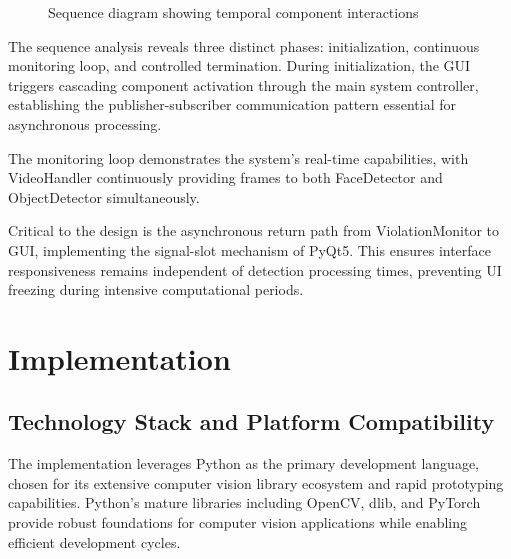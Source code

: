 \documentclass[conference]{IEEEtran}
\begin{document}
\begin{figure}[H]
    \caption{Sequence diagram showing temporal component interactions}
\end{figure}

The sequence analysis reveals three distinct phases: initialization, continuous monitoring 
loop, and controlled termination. During initialization, the GUI triggers cascading component 
activation through the main system controller, establishing the publisher-subscriber 
communication pattern essential for asynchronous processing.

The monitoring loop demonstrates the system's real-time capabilities, with VideoHandler 
continuously providing frames to both FaceDetector and ObjectDetector simultaneously. 

Critical to the design is the asynchronous return path from ViolationMonitor to GUI, 
implementing the signal-slot mechanism of PyQt5. This ensures interface responsiveness 
remains independent of detection processing times, preventing UI freezing during intensive 
computational periods.

\section{Implementation}

\subsection{Technology Stack and Platform Compatibility}

The implementation leverages Python as the primary development language, chosen for its 
extensive computer vision library ecosystem and rapid prototyping capabilities. Python's 
mature libraries including OpenCV, dlib, and PyTorch provide robust foundations for 
computer vision applications while enabling efficient development cycles.
\end{document}
